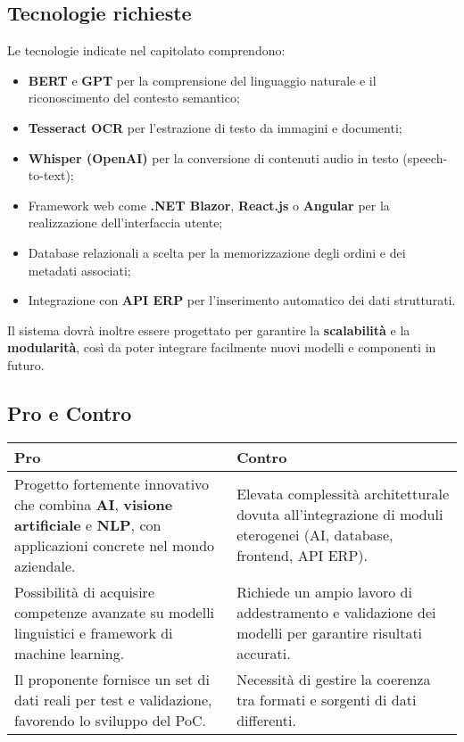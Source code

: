 \documentclass[a4paper,12pt]{article}
\begin{document}
{{{    \subsection{Tecnologie richieste}
        Le tecnologie indicate nel capitolato comprendono:
        \begin{itemize}
            \item \textbf{BERT} e \textbf{GPT} per la comprensione del linguaggio naturale e il riconoscimento del contesto semantico;
            \item \textbf{Tesseract OCR} per l’estrazione di testo da immagini e documenti;
            \item \textbf{Whisper (OpenAI)} per la conversione di contenuti audio in testo (speech-to-text);
            \item Framework web come \textbf{.NET Blazor}, \textbf{React.js} o \textbf{Angular} per la realizzazione dell’interfaccia utente;
            \item Database relazionali a scelta per la memorizzazione degli ordini e dei metadati associati;
            \item Integrazione con \textbf{API ERP} per l’inserimento automatico dei dati strutturati.
        \end{itemize}
        Il sistema dovrà inoltre essere progettato per garantire la \textbf{scalabilità} e la \textbf{modularità}, così da poter integrare facilmente nuovi modelli e componenti in futuro.
    

    \subsection{Pro e Contro}
        \begin{center}
            \begin{tabular}{|p{9cm}|p{5cm}|}
                \hline
                \textbf{Pro} & \textbf{Contro} \\
                \hline
                Progetto fortemente innovativo che combina \textbf{AI}, \textbf{visione artificiale} e \textbf{NLP}, con applicazioni concrete nel mondo aziendale. & Elevata complessità architetturale dovuta all’integrazione di moduli eterogenei (AI, database, frontend, API ERP). \\
                \hline
                Possibilità di acquisire competenze avanzate su modelli linguistici e framework di machine learning. & Richiede un ampio lavoro di addestramento e validazione dei modelli per garantire risultati accurati. \\
                \hline
                Il proponente fornisce un set di dati reali per test e validazione, favorendo lo sviluppo del PoC. & Necessità di gestire la coerenza tra formati e sorgenti di dati differenti. \\
                \hline
            \end{tabular}
        \end{center}
    

}}}
\end{document}
